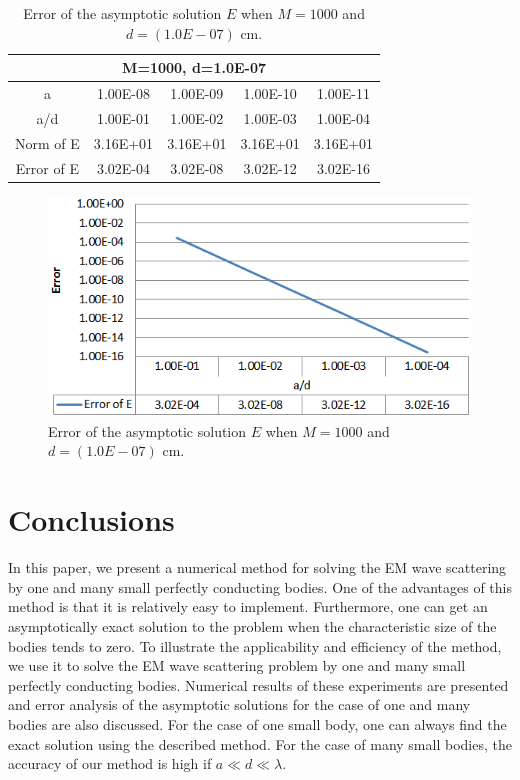\documentclass[12pt]{article}
\numberwithin{equation}{section}
\begin{document}
\begin{table}[htbp]
  \centering
  \caption{Error of the asymptotic solution $E$ when $M=1000$ and $d=(1.0E-07)$ cm.}
    \begin{tabular}{ccccc}
      \toprule
         \multicolumn{5}{c}{M=1000, d=1.0E-07} \\
      \midrule
		a     & 1.00E-08 & 1.00E-09 & 1.00E-10 & 1.00E-11 \\	
	    a/d   & 1.00E-01 & 1.00E-02 & 1.00E-03 & 1.00E-04 \\
	    Norm of E & 3.16E+01 & 3.16E+01 & 3.16E+01 & 3.16E+01 \\
	    Error of E & 3.02E-04 & 3.02E-08 & 3.02E-12 & 3.02E-16 \\
      \bottomrule
    \end{tabular}%
  \label{tab2}%
\end{table}%
\begin{figure}[htbp]
    \centering
    \includegraphics[scale=0.95]{M1000}
    \caption{Error of the asymptotic solution $E$ when $M=1000$ and $d=(1.0E-07)$ cm.}
    \label{fig2}
\end{figure}

\section{Conclusions} \label{sec4}
In this paper, we present a numerical method for solving the EM wave scattering by one and many small perfectly conducting bodies. One of the advantages of this method is that it is relatively easy to implement. Furthermore, one can get an asymptotically exact solution to the problem when the characteristic size of the bodies tends to zero. To illustrate the applicability and efficiency of the method, we use it to solve the EM wave scattering problem by one and many small perfectly conducting bodies. Numerical results of these experiments are presented and error analysis of the asymptotic solutions for the case of one and many bodies are also discussed. For the case of one small body, one can always find the exact solution using the described method. For the case of many small bodies, the accuracy of our method is high if $a \ll d \ll \lambda$. 
\end{document}
